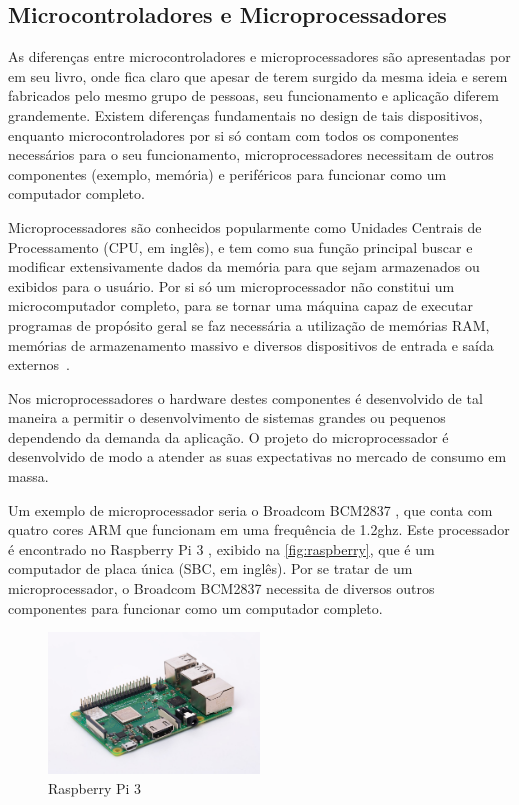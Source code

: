 \subsection{Microcontroladores e Microprocessadores}%

As diferenças entre microcontroladores e microprocessadores são apresentadas por  em seu livro, onde fica claro que apesar de terem surgido da mesma ideia e serem fabricados pelo mesmo grupo de pessoas, seu funcionamento e aplicação diferem grandemente. Existem diferenças fundamentais no design de tais dispositivos, enquanto microcontroladores por si só contam com todos os componentes necessários para o seu funcionamento, microprocessadores necessitam de outros componentes (exemplo, memória) e periféricos para funcionar como um computador completo.

Microprocessadores são conhecidos popularmente como Unidades Centrais de Processamento (CPU, em inglês), e tem como sua função principal buscar e modificar extensivamente dados da memória para que sejam armazenados ou exibidos para o usuário. Por si só um microprocessador não constitui um microcomputador completo, para se tornar uma máquina capaz de executar programas de propósito geral se faz necessária a utilização de memórias RAM, memórias de armazenamento massivo e diversos dispositivos de entrada e saída externos~\cite{ayala:1991}.

Nos microprocessadores o hardware destes componentes é desenvolvido de tal maneira a permitir o desenvolvimento de sistemas grandes ou pequenos dependendo da demanda da aplicação. O projeto do microprocessador é desenvolvido de modo a atender as suas expectativas no mercado de consumo em massa.  

Um exemplo de microprocessador seria o Broadcom BCM2837 \cite{raspberry_bcm}, que conta com quatro cores ARM que funcionam em uma frequência de 1.2ghz. Este processador é encontrado no Raspberry Pi 3 \cite{raspberry:pi3}, exibido na \autoref{fig:raspberry}, que é um computador de placa única (SBC, em inglês). Por se tratar de um microprocessador, o Broadcom BCM2837 necessita de diversos outros componentes para funcionar como um computador completo.

\begin{figure}[ht]
    \centering
    \includegraphics[width=0.5\textwidth, keepaspectratio]{resources/rasp.jpg}
    \caption{Raspberry Pi 3}
    \label{fig:raspberry}
\end{figure}

